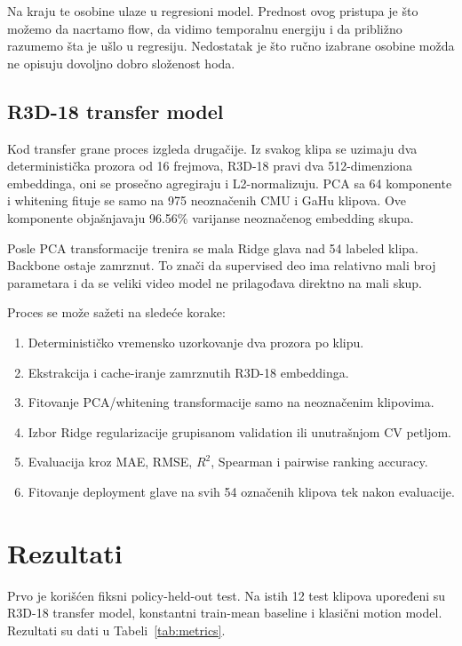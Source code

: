 \documentclass[12pt,a4paper]{report}
\begin{document}
Na kraju te osobine ulaze u regresioni model. Prednost ovog pristupa je što
možemo da nacrtamo flow, da vidimo temporalnu energiju i da približno razumemo
šta je ušlo u regresiju. Nedostatak je što ručno izabrane osobine možda ne
opisuju dovoljno dobro složenost hoda.

\subsection{R3D-18 transfer model}

Kod transfer grane proces izgleda drugačije. Iz svakog klipa se uzimaju dva
deterministička prozora od 16 frejmova, R3D-18 pravi dva 512-dimenziona
embeddinga, oni se prosečno agregiraju i L2-normalizuju. PCA sa 64 komponente i
whitening fituje se samo na 975 neoznačenih CMU i GaHu klipova. Ove komponente
objašnjavaju 96.56\% varijanse neoznačenog embedding skupa.

Posle PCA transformacije trenira se mala Ridge glava nad 54 labeled klipa.
Backbone ostaje zamrznut. To znači da supervised deo ima relativno mali broj
parametara i da se veliki video model ne prilagođava direktno na mali skup.

Proces se može sažeti na sledeće korake:
\begin{enumerate}[leftmargin=1.4cm]
  \item Determinističko vremensko uzorkovanje dva prozora po klipu.
  \item Ekstrakcija i cache-iranje zamrznutih R3D-18 embeddinga.
  \item Fitovanje PCA/whitening transformacije samo na neoznačenim klipovima.
  \item Izbor Ridge regularizacije grupisanom validation ili unutrašnjom CV petljom.
  \item Evaluacija kroz MAE, RMSE, $R^2$, Spearman i pairwise ranking accuracy.
  \item Fitovanje deployment glave na svih 54 označenih klipova tek nakon evaluacije.
\end{enumerate}

\section{Rezultati}

Prvo je korišćen fiksni policy-held-out test. Na istih 12 test klipova
upoređeni su R3D-18 transfer model, konstantni train-mean baseline i klasični
motion model. Rezultati su dati u Tabeli~\ref{tab:metrics}.
\end{document}
